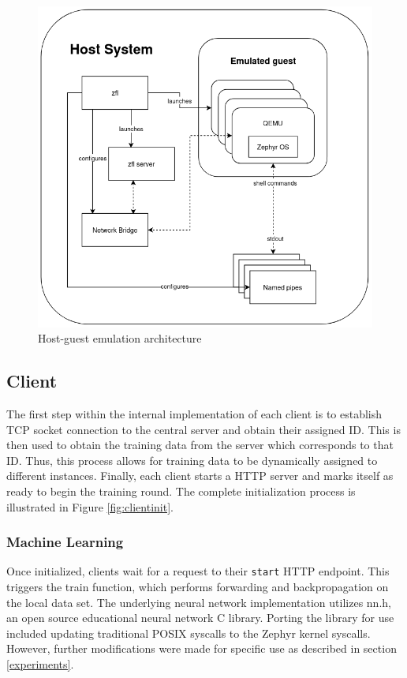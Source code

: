 \documentclass[12pt]{article}
\begin{document}
\begin{figure}
  \includegraphics[scale=0.8]{architecture}
  \caption{Host-guest emulation architecture}
  \label{fig:architecture}
\centering
\end{figure}

\subsection{Client}
The first step within the internal implementation of each client is to establish TCP socket connection to the central server and obtain
their assigned ID. This is then used to obtain the training data from the server which corresponds
to that ID. Thus, this process allows for training data to be dynamically assigned to different
instances. Finally, each client starts a HTTP server and marks itself as ready to begin the training round.
The complete initialization process is illustrated in Figure \ref{fig:clientinit}.

\subsubsection{Machine Learning}
Once initialized, clients wait for a request to their \verb|start| HTTP endpoint. This triggers the
train function, which performs forwarding and backpropagation on the local data set.
The underlying neural network implementation utilizes nn.h\cite{_2024_tsodingnnh},
an open source educational neural network C library. Porting the library for use included updating
traditional POSIX syscalls to the Zephyr kernel syscalls. However, further modifications were made for specific use as described in
section \ref{experiments}. %
\end{document}
